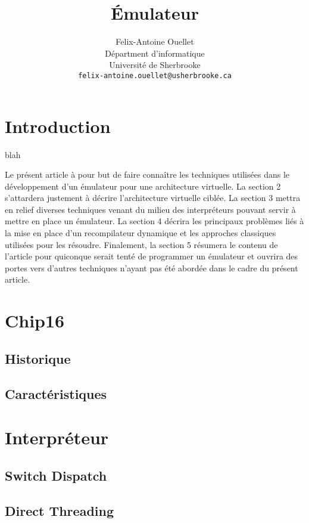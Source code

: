 \documentclass{article} %
\title{Émulateur}
\author{
Felix-Antoine Ouellet \\
Départment d'informatique \\
Université de Sherbrooke \\
\texttt{felix-antoine.ouellet@usherbrooke.ca} \\
}
\begin{document}
\maketitle

\begin{abstract}
\end{abstract}

\section{Introduction}
blah

Le présent article à pour but de faire connaître les techniques utilisées dans le développement d'un émulateur pour une architecture virtuelle. La section 2 s'attardera justement à décrire l'architecture virtuelle ciblée. La section 3 mettra en relief diverses techniques venant du milieu des interpréteurs pouvant servir à mettre en place un émulateur. La section 4 décrira les principaux problèmes liés à la mise en place d'un recompilateur dynamique et les approches classiques utilisées pour les résoudre. Finalement, la section 5 résumera le contenu de l'article pour quiconque serait tenté de programmer un émulateur et ouvrira des portes vers d'autres techniques n'ayant pas été abordée dans le cadre du présent article.

\section{Chip16}

\subsection{Historique}

\subsection{Caractéristiques}

\section{Interpréteur}

\subsection{Switch Dispatch}

\subsection{Direct Threading}
\end{document}

